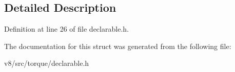 \subsection{Detailed Description}


Definition at line 26 of file declarable.\+h.



The documentation for this struct was generated from the following file\+:\begin{DoxyCompactItemize}
\item 
v8/src/torque/declarable.\+h\end{DoxyCompactItemize}
